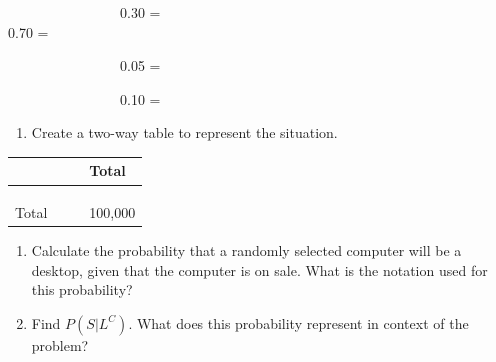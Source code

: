 \documentclass[
]{report}
\providecommand{\tightlist}{%
  \setlength{\itemsep}{0pt}\setlength{\parskip}{0pt}}
\begin{document}
~~~~~~~~~~~~~~~~0.30 = \vspace{.2in}\\
\hspace*{0.333em}\hspace*{0.333em}\hspace*{0.333em}\hspace*{0.333em}\hspace*{0.333em}\hspace*{0.333em}\hspace*{0.333em}\hspace*{0.333em}\hspace*{0.333em}\hspace*{0.333em}\hspace*{0.333em}\hspace*{0.333em}\hspace*{0.333em}\hspace*{0.333em}\hspace*{0.333em}\hspace*{0.333em}0.70 =

\vspace{.2in}

~~~~~~~~~~~~~~~~0.05 =

\vspace{.2in}

~~~~~~~~~~~~~~~~0.10 =

\vspace{.2in}

\begin{enumerate}
\def\labelenumi{\alph{enumi}.}
\setcounter{enumi}{1}
\tightlist
\item
  Create a two-way table to represent the situation.
\end{enumerate}

\begin{longtable}[]{@{}llll@{}}
\toprule
\hspace{1in} & \hspace{1in} & \hspace{1in} & Total\tabularnewline
\midrule
\endhead
\hspace{1in} & & &\tabularnewline
\hspace{1in} & & &\tabularnewline
\hspace{1in} & & &\tabularnewline
Total & & & 100,000\tabularnewline
\bottomrule
\end{longtable}

\begin{enumerate}
\def\labelenumi{\alph{enumi}.}
\setcounter{enumi}{2}
\item
  Calculate the probability that a randomly selected computer will be a desktop, given that the computer is on sale. What is the notation used for this probability?
  \vspace{1in}
\item
  Find \(P(S | L^C)\). What does this probability represent in context of the problem?
  \vspace{1in}
\end{enumerate}
\end{document}
